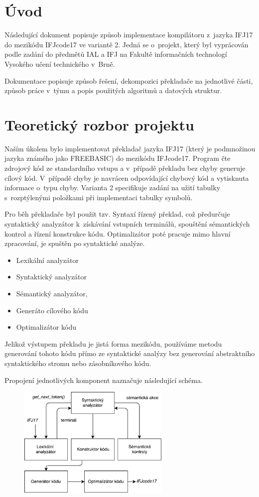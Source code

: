 \section{Úvod}
Následující dokument popisuje způsob implementace kompilátoru z~jazyka IFJ17 do mezikódu
IFJcode17 ve variantě 2. Jedná se o~projekt,
který byl vyprácován podle zadání do předmětů IAL a IFJ na Fakultě
informačních technologí Vysokého učení technického v~Brně.

Dokumentace popisuje způsob řešení, dekompozici překladače na jednotlivé části,
způsob práce v~týmu a popis použitých algoritmů a datových struktur.

\section{Teoretický rozbor projektu}
Naším úkolem bylo implementovat překladač jazyka IFJ17 (který je podmnožinou jazyka známého jako FREEBASIC) do mezikódu IFJcode17. Program čte zdrojový kód ze standardního vstupu a v~případě překladu bez chyby generuje cílový kód. V~případě chyby je navrácen odpovídající chybový kód a vytisknuta informace o~typu chyby.
Varianta 2 specifikuje zadání na užití tabulky s~rozptýlenými položkami při implementaci tabulky symbolů.

Pro běh překladače byl použit tzv. Syntaxí řízený překlad, což předurčuje syntaktický analyzátor k~získávání vstupních terminálů, spouštění sémantických kontrol a řízení konstrukce kódu. Optimalizátor poté pracuje mimo hlavní zpracování, je spuštěn po syntaktické analýze.

\begin{itemize}
    \item Lexikální analyzátor
    \item Syntaktický analyzátor
    \item Sémantický analyzátor,
    \item Generáto cílového kódu
    \item Optimalizátor kódu
\end{itemize}

Jelikož výstupem překladu je jistá forma mezikódu, používáme metodu generování tohoto kódu přímo ze syntaktické
analýzy bez generování abstraktního syntaktického stromu nebo zásobníkového kódu.

Propojení jednotlivých komponent naznačuje následující schéma.
\vspace*{4px}
\begin{figure}[htbp]
\centering
\includegraphics[width=0.65\textwidth, angle=0]{src/assets/structure.pdf}
\end{figure}